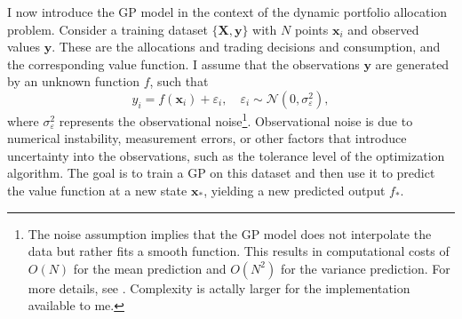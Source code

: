 \documentclass[11pt]{article}
\begin{document}
I now introduce the \ac{GP} model in the context of the dynamic portfolio allocation problem.
Consider a training dataset \( \{ \mathbf{X}, \mathbf{y} \} \)
with \( N \) points \( \mathbf{x}_{i} \) and observed values \( \mathbf{y} \). These are the allocations and trading decisions and consumption, and the corresponding value function. 
I assume that the observations \( \mathbf{y} \) are generated by an unknown function \( f \), such that
\[
y_i = f(\mathbf{x}_i) + \varepsilon_{i}, \quad \varepsilon_{i} \sim \mathcal{N}(0, \sigma^{2}_{\varepsilon}),
\]
where \( \sigma^{2}_{\varepsilon} \) represents the observational noise\footnote{The noise assumption implies that the GP model does not interpolate the data but rather fits a smooth function. 
This results in computational costs of \( O(N) \) for the mean prediction and \( O(N^2) \) for the variance prediction. For more details, see \autocite{MurphyBook2023}.
Complexity is actally larger for the implementation available to me.}.
Observational noise is due to numerical instability, measurement errors, or other factors that introduce uncertainty into the observations, such as the tolerance level of the optimization algorithm.
The goal is to train a \ac{GP} on this dataset and then use it to predict the value function at a new state \( \mathbf{x}_{*} \),
yielding a new predicted output \( f_{*} \).
\end{document}
